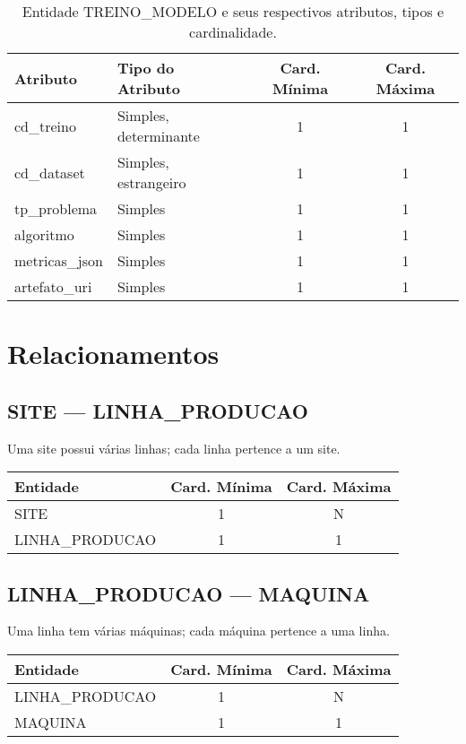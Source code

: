 \documentclass[10pt,a4paper]{article}
\begin{document}
\begin{table}[h!]
\centering
\begin{tabular}{| l | l | c | c |}
\hline
\rowcolor{red}\color{white}\textbf{Atributo} & \color{white}\textbf{Tipo do Atributo} & \color{white}\textbf{Card. Mínima} & \color{white}\textbf{Card. Máxima} \\
\hline
cd\_treino & Simples, determinante & 1 & 1 \\
cd\_dataset & Simples, estrangeiro & 1 & 1 \\
tp\_problema & Simples & 1 & 1 \\
algoritmo & Simples & 1 & 1 \\
metricas\_json & Simples & 1 & 1 \\
artefato\_uri & Simples & 1 & 1 \\
\hline
\end{tabular}
\caption{Entidade TREINO\_MODELO e seus respectivos atributos, tipos e cardinalidade.}
\label{tab:treino_modelo}
\end{table}

\newpage
\section*{Relacionamentos}
\small
\subsection*{SITE — LINHA\_PRODUCAO}
Uma site possui várias linhas; cada linha pertence a um site.
\begin{center}
\begin{tabular}{|l|c|c|}
\hline
\rowcolor{vermelhoheader}\color{white}\textbf{Entidade} & \textbf{Card. Mínima} & \textbf{Card. Máxima} \\
\hline
SITE & 1 & N \\
LINHA\_PRODUCAO & 1 & 1 \\
\hline
\end{tabular}
\end{center}
\hfill
\subsection*{LINHA\_PRODUCAO — MAQUINA}
Uma linha tem várias máquinas; cada máquina pertence a uma linha.
\begin{center}
\begin{tabular}{|l|c|c|}
\hline
\rowcolor{vermelhoheader}\color{white}\textbf{Entidade} & \textbf{Card. Mínima} & \textbf{Card. Máxima} \\
\hline
LINHA\_PRODUCAO & 1 & N \\
MAQUINA & 1 & 1 \\
\hline
\end{tabular}
\end{center}
\vspace{0.5cm}
\end{document}
